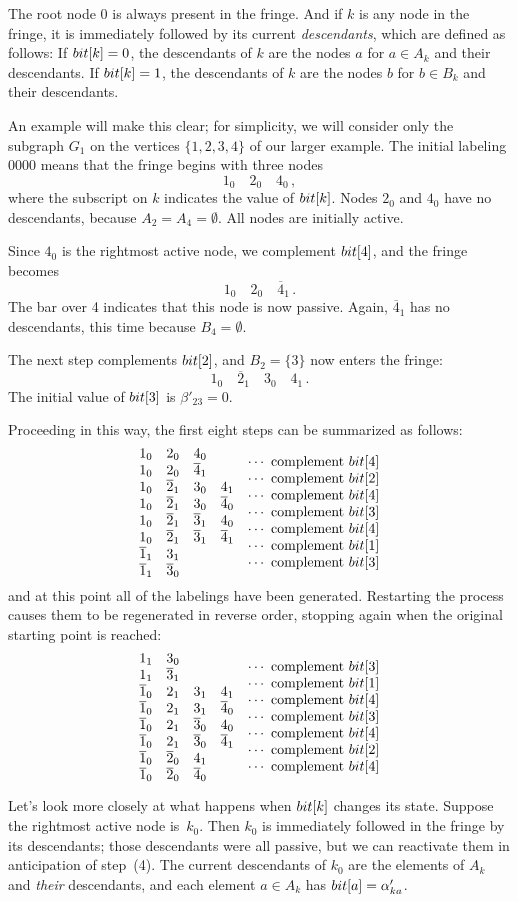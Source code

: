 The root node 0 is always present in the fringe.
And if $k$ is any node in the fringe, it is immediately followed
by its current {\it descendants}, which are defined as follows:
If $\\{bit}[k]=0$, the descendants of $k$ are the nodes $a$ for $a\in A_k$
and their descendants. If $\\{bit}[k]=1$, the descendants of $k$ are the nodes
$b$ for $b\in B_k$ and their descendants.

\fi

An example will make this clear; for simplicity, we will
consider only
the subgraph $G_1$ on the vertices $\{1,2,3,4\}$ of our larger example.
The initial labeling 0000 means that the fringe begins with three nodes
$$1_0\quad 2_0\quad 4_0\,,$$
where the subscript on $k$ indicates the value of $\\{bit}[k]$. Nodes
$2_0$ and $4_0$ have no descendants, because $A_2=A_4=\emptyset$.
All nodes are initially active.

\def\p#1{\overline#1}
Since $4_0$ is the rightmost active node, we complement $\\{bit}[4]$, and
the fringe becomes
$$1_0\quad 2_0\quad \p4_1\,.$$
The bar over 4 indicates that this node is now passive. Again, $\p4_1$
has no descendants, this time because $B_4=\emptyset$.

The next step complements $\\{bit}[2]$, and $B_2=\{3\}$ now enters the fringe:
$$1_0\quad \p2_1\quad 3_0\quad 4_1\,.$$
The initial value of $\\{bit}[3]$ is $\beta'_{23}=0$.

\fi

Proceeding in this way,
the first eight steps can be summarized as follows:
$$\vbox{\halign{$#\hfil$&
\quad\smash{\lower.5\baselineskip\hbox{$\cdots$ complement $\bit#$\hfil}}\cr
1_0\quad 2_0\quad 4_0&4\cr
1_0\quad 2_0\quad \p4_1&2\cr
1_0\quad \p2_1\quad 3_0\quad 4_1&4\cr
1_0\quad \p2_1\quad 3_0\quad \p4_0&3\cr
1_0\quad \p2_1\quad \p3_1\quad 4_0&4\cr
1_0\quad \p2_1\quad \p3_1\quad \p4_1&1\cr
\p1_1\quad 3_1&3\cr
\p1_1\quad \p3_0\cr}}$$
and at this point all of the labelings have been generated.
Restarting the process causes
them to be regenerated in reverse order, stopping again when the original
starting point is reached:
$$\vbox{\halign{$#\hfil$&
\quad\smash{\lower.5\baselineskip\hbox{$\cdots$ complement $\bit#$\hfil}}\cr
1_1\quad 3_0&3\cr
1_1\quad \p3_1&1\cr
\p1_0\quad 2_1\quad 3_1\quad 4_1&4\cr
\p1_0\quad 2_1\quad 3_1\quad \p4_0&3\cr
\p1_0\quad 2_1\quad \p3_0\quad 4_0&4\cr
\p1_0\quad 2_1\quad \p3_0\quad \p4_1&2\cr
\p1_0\quad \p2_0\quad 4_1&4\cr
\p1_0\quad \p2_0\quad \p4_0\cr}}$$

\fi

Let's look more closely at what happens when $\\{bit}[k]$
changes its state.
Suppose the rightmost active node is~$k_0$. Then $k_0$ is immediately followed
in the fringe by its descendants; those descendants were all passive, but
we can reactivate them in anticipation of step~(4). The current descendants
of $k_0$ are the elements of $A_k$ and {\it their\/} descendants, and each
element $a\in A_k$ has $\\{bit}[a]=\alpha'_{ka}$.


